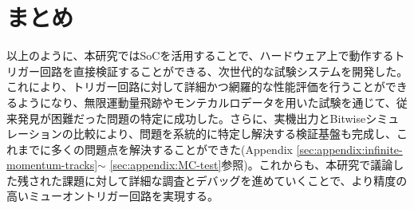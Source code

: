 \section{まとめ}
以上のように、本研究ではSoCを活用することで、ハードウェア上で動作するトリガー回路を直接検証することができる、次世代的な試験システムを開発した。
これにより、トリガー回路に対して詳細かつ網羅的な性能評価を行うことができるようになり、無限運動量飛跡やモンテカルロデータを用いた試験を通じて、従来発見が困難だった問題の特定に成功した。さらに、実機出力とBitwiseシミュレーションの比較により、問題を系統的に特定し解決する検証基盤も完成し、これまでに多くの問題点を解決することができた(Appendix \ref{sec:appendix:infinite-momentum-tracks}$\sim$ \ref{sec:appendix:MC-test}参照)。これからも、本研究で議論した残された課題に対して詳細な調査とデバッグを進めていくことで、より精度の高いミューオントリガー回路を実現する。



